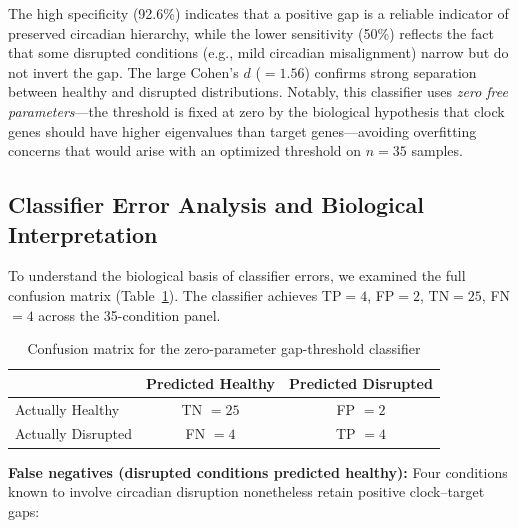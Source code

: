\documentclass[11pt,a4paper]{article}
\begin{document}
The high specificity (92.6\%) indicates that a positive gap is a reliable indicator of preserved circadian hierarchy, while the lower sensitivity (50\%) reflects the fact that some disrupted conditions (e.g., mild circadian misalignment) narrow but do not invert the gap. The large Cohen's $d$ ($= 1.56$) confirms strong separation between healthy and disrupted distributions. Notably, this classifier uses \textit{zero free parameters}---the threshold is fixed at zero by the biological hypothesis that clock genes should have higher eigenvalues than target genes---avoiding overfitting concerns that would arise with an optimized threshold on $n = 35$ samples.

\subsection{Classifier Error Analysis and Biological Interpretation}

To understand the biological basis of classifier errors, we examined the full confusion matrix (Table~\ref{tab:confusion_matrix}). The classifier achieves TP$=4$, FP$=2$, TN$=25$, FN$=4$ across the 35-condition panel.

\begin{table}[H]
\centering
\caption{Confusion matrix for the zero-parameter gap-threshold classifier}
\label{tab:confusion_matrix}
\begin{tabular}{lcc}
\toprule
 & Predicted Healthy & Predicted Disrupted \\
\midrule
Actually Healthy & TN $= 25$ & FP $= 2$ \\
Actually Disrupted & FN $= 4$ & TP $= 4$ \\
\bottomrule
\end{tabular}
\end{table}

\textbf{False negatives (disrupted conditions predicted healthy):} Four conditions known to involve circadian disruption nonetheless retain positive clock--target gaps:
\end{document}
